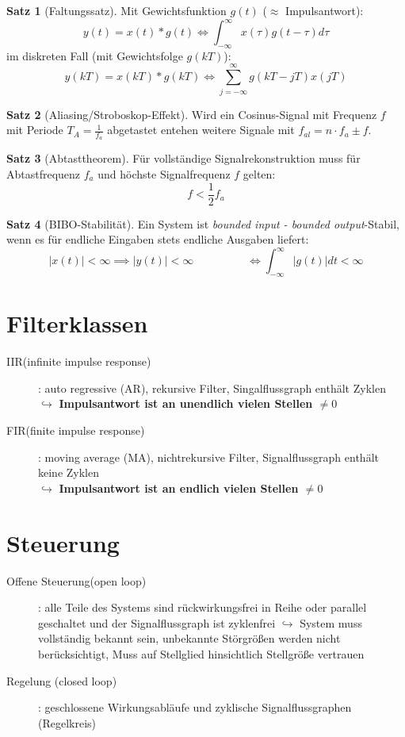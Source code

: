\documentclass[a4paper, 11pt]{scrartcl}
\theoremstyle{definition}
\newtheorem{theorem}{Satz}
\begin{document}
\begin{theorem}[Faltungssatz]
    Mit Gewichtsfunktion $g(t)$ ($\approx$ Impulsantwort):
        \[y(t)=x(t)*g(t)\Leftrightarrow\int_{-\infty}^{\infty}x(\tau)g(t-\tau)d\tau\]
    im diskreten Fall (mit Gewichtsfolge $g(kT)$):
        \[y(kT)=x(kT)*g(kT)\Leftrightarrow\sum_{j=-\infty}^\infty g(kT-jT)x(jT)\]
\end{theorem}
\begin{theorem}[Aliasing/Stroboskop-Effekt]
    Wird ein Cosinus-Signal mit Frequenz $f$ mit Periode $T_A = \frac{1}{f_a}$ abgetastet entehen weitere Signale mit $f_{al}=n\cdot f_a\pm f$.
\end{theorem}
\begin{theorem}[Abtasttheorem]
    Für vollständige Signalrekonstruktion muss für Abtastfrequenz $f_a$ und höchste Signalfrequenz $f$ gelten:
    \[f<\frac{1}{2}f_a\]
\end{theorem}
\begin{theorem}[BIBO-Stabilität]
    Ein System ist \emph{bounded input - bounded output}-Stabil, wenn es für endliche Eingaben stets endliche Ausgaben liefert:
    \[|x(t)|<\infty\implies|y(t)|<\infty \hspace{2cm}\Leftrightarrow \int_{-\infty}^\infty|g(t)|dt<\infty\]
\end{theorem}

\section{Filterklassen}
\begin{description}
	\item[IIR(infinite impulse response)]: auto regressive (AR), rekursive Filter, Singalflussgraph enthält Zyklen\\
		$\hookrightarrow$ \textbf{Impulsantwort ist an unendlich vielen Stellen $\neq0$}
	\item[FIR(finite impulse response)]: moving average (MA), nichtrekursive Filter, Signalflussgraph enthält keine Zyklen\\
	 	$\hookrightarrow$ \textbf{Impulsantwort ist an endlich vielen Stellen $\neq0$}
\end{description}

\section{Steuerung}
\begin{description}
	\item[Offene Steuerung(open loop)]: alle  Teile  des  Systems  sind  rückwirkungsfrei  in  Reihe  oder  parallel geschaltet  und  der Signalflussgraph  ist zyklenfrei
		$\hookrightarrow$ System muss vollständig bekannt sein, unbekannte Störgrößen werden nicht berücksichtigt, Muss auf Stellglied hinsichtlich Stellgröße vertrauen
	\item[Regelung (closed loop)]: geschlossene Wirkungsabläufe  und  zyklische Signalflussgraphen  (Regelkreis)
\end{description}
\end{document}
